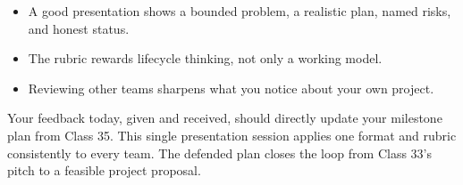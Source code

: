 \classclosingframe
{\begin{itemize}
\item A good presentation shows a bounded problem, a realistic plan, named risks, and honest status.
\item The rubric rewards lifecycle thinking, not only a working model.
\item Reviewing other teams sharpens what you notice about your own project.
\end{itemize}}
{Your feedback today, given and received, should directly update your milestone plan from Class 35.}
{This single presentation session applies one format and rubric consistently to every team.}
{The defended plan closes the loop from Class 33's pitch to a feasible project proposal.}


